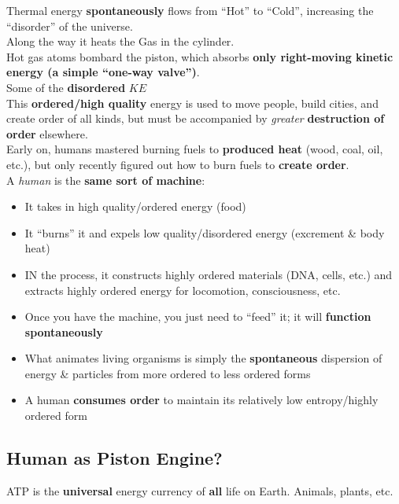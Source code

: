 \documentclass[12pt]{article}
\theoremstyle{definition}
\begin{document}
Thermal energy \textbf{spontaneously} flows from ``Hot'' to ``Cold'', increasing the ``disorder'' of the universe. \\

Along the way it heats the Gas in the cylinder. \\
Hot gas atoms bombard the piston, which absorbs \textbf{only right-moving kinetic energy (a simple ``one-way valve'')}. \\

Some of the \textbf{disordered} $KE$ \\

This \textbf{ordered/high quality} energy is used to move people, build cities, and create order of all kinds, but must be accompanied by \emph{greater} \textbf{destruction of order} elsewhere. \\

Early on, humans mastered burning fuels to \textbf{produced heat} (wood, coal, oil, etc.), but only recently figured out how to burn fuels to \textbf{create order}. \\

A \emph{human} is the \textbf{same sort of machine}:
\begin{itemize}
  \item It takes in high quality/ordered energy (food)
  \item It ``burns'' it and expels low quality/disordered energy (excrement \& body heat)
  \item IN the process, it constructs highly ordered materials (DNA, cells, etc.) and extracts highly ordered energy for locomotion, consciousness, etc.
  \item Once you have the machine, you just need to ``feed'' it;
  it will \textbf{function spontaneously}
  \item What animates living organisms is simply the \textbf{spontaneous} dispersion of energy \& particles from more ordered to less ordered forms
  \item A human \textbf{consumes order} to maintain its relatively low entropy/highly ordered form
\end{itemize}

\subsection{Human as Piston Engine?}
ATP is the \textbf{universal} energy currency of \textbf{all} life on Earth.
Animals, plants, etc. \\
\end{document}
